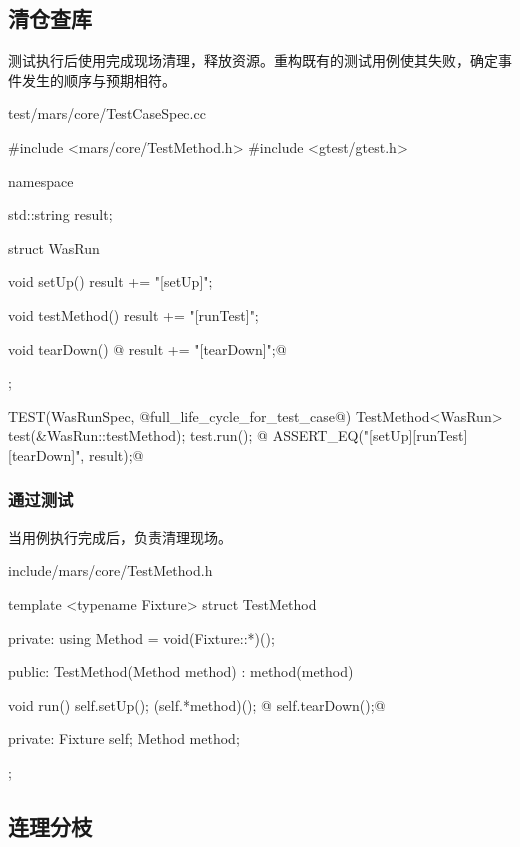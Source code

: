 \begin{content}

\subsection{清仓查库}

测试执行后使用完成现场清理，释放资源。重构既有的测试用例使其失败，确定事件发生的顺序与预期相符。

\begin{nodiff}{test/mars/core/TestCaseSpec.cc}
 \begin{c++}
#include <mars/core/TestMethod.h>
#include <gtest/gtest.h>

namespace {
  std::string result;

  struct WasRun {
    void setUp() {
      result += "[setUp]";
    }

    void testMethod() {
      result += "[runTest]";
    }

    void tearDown() {
@      result += "[tearDown]";@
    }
  };
}

TEST(WasRunSpec, @full_life_cycle_for_test_case@) {
  TestMethod<WasRun> test(&WasRun::testMethod);
  test.run();
@  ASSERT_EQ("[setUp][runTest][tearDown]", result);@
}
\end{c++}
\end{nodiff}

\subsubsection{通过测试}

当用例执行完成后，负责清理现场。

\begin{nodiff}{include/mars/core/TestMethod.h}
 \begin{c++}
template <typename Fixture>
struct TestMethod {
private:
  using Method = void(Fixture::*)();

public:
  TestMethod(Method method)
    : method(method) {}

  void run() {
    self.setUp();
    (self.*method)();
@    self.tearDown();@
  }

private:
  Fixture self;
  Method method;
};
  \end{c++}
\end{nodiff}

\subsection{连理分枝}


\end{content}
